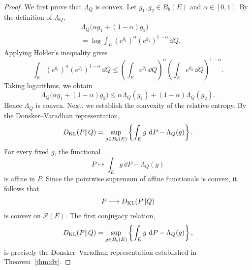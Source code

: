 \documentclass[12pt,a4paper,oneside]{book}
\begin{document}
\begin{proof}
We first prove that $\Lambda_Q$ is convex. Let $g_1,g_2\in B_b(E)$ and $\alpha\in[0,1]$. By the definition of $\Lambda_Q$,
\begin{equation*}
    \begin{aligned}
        &\Lambda_Q\bigl(\alpha g_1+(1-\alpha)g_2\bigr)\\
        &= \log\int_E (e^{g_1})^\alpha (e^{g_2})^{1-\alpha}\,\dd Q.
    \end{aligned}
\end{equation*}
Applying H\"older's inequality gives
\begin{equation*}
    \int_E (e^{g_1})^\alpha (e^{g_2})^{1-\alpha}\,\dd Q \leq
    \left(\int_E e^{g_1}\,\dd Q\right)^\alpha \left(\int_E e^{g_2}\,\dd Q\right)^{1-\alpha}.
\end{equation*}
Taking logarithms, we obtain
\begin{equation*}
    \Lambda_Q\bigl(\alpha g_1+(1-\alpha)g_2\bigr)\leq \alpha\Lambda_Q(g_1) + (1-\alpha)\Lambda_Q(g_2).
\end{equation*}
Hence $\Lambda_Q$ is convex. Next, we establish the convexity of the relative entropy. By the Donsker--Varadhan representation,
\begin{equation*}
    D_{\mathrm{KL}}(P\Vert Q) = \sup_{g\in B_b(E)}
        \left\{
            \int_E g\,\,\mathrm{d} P-\Lambda_Q(g)
        \right\}.
\end{equation*}
For every fixed $g$, the functional
\begin{equation*}
    P\longmapsto \int_E g\,\dd P-\Lambda_Q(g)
\end{equation*}
is affine in $P$. Since the pointwise supremum of affine functionals is convex, it follows that
\begin{equation*}
    P\longmapsto D_{\mathrm{KL}}(P\Vert Q)
\end{equation*}
is convex on $\mathcal P(E)$. The first conjugacy relation,
\begin{equation*}
    D_{\mathrm{KL}}(P\Vert Q) = \sup_{g\in B_b(E)}
        \left\{
            \int_E g\,\,\mathrm{d} P-\Lambda_Q(g)
        \right\},
\end{equation*}
is precisely the Donsker--Varadhan representation established in Theorem~\ref{thm:dv}.


\end{proof}
\end{document}

